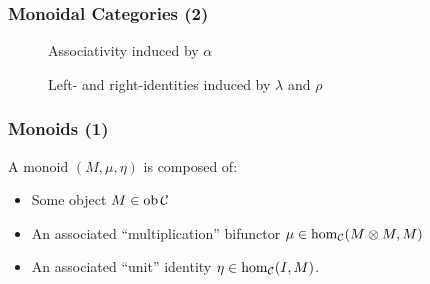 \documentclass{beamer}
\numberwithin{figure}{section}
\begin{document}
\begin{frame}
        \frametitle{Monoidal Categories (2)}
        \begin{figure}
                \caption{Associativity induced by $\alpha$}
        \end{figure}

        \vfill
        \pause
        \begin{figure}
                \caption{Left- and right-identities induced by $\lambda$ and
                $\rho$}
        \end{figure}
\end{frame}

\begin{frame}
        \frametitle{Monoids (1)}
        A monoid $(M,\mu,\eta)$ is composed of:
        \begin{itemize}
                \item Some object $M \in \operatorname{ob} \mathcal{C}$
                \item An associated ``multiplication'' bifunctor $\mu \in
                        \hom_\mathcal{C} (M \otimes M, M)$
                \item An associated ``unit'' identity
                        $\eta \in \hom_\mathcal{C} (I, M)$.
        \end{itemize}
\end{frame}
\end{document}
